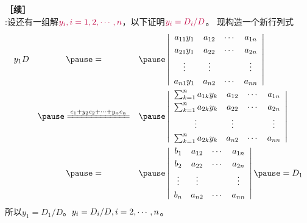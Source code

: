 \begin{frame} 
  \begin{footnotesize}
    \proofname\textbf{［续］}\\
    :设还有一组解$\textcolor{purple}{y_i, i = 1, 2, \cdots, n}$，以下证明$\textcolor{purple}{y_i =D_i/D}$。
    \pause 现构造一个新行列式
    $$
    \begin{array}{rcl}
      y_1D &\pause = &\pause \left|
      \begin{array}{cccc}
        a_{11}y_1 & a_{12}    &  \cd   &   a_{1n}      \\[0.1cm] 
        a_{21}y_1 & a_{22}    &  \cd   &   a_{2n}      \\[0.1cm] 
        \vd    &    \vd     &        &     \vd      \\[0.1cm] 
        a_{n1}y_1 & a_{n2}    &  \cd   &   a_{nn}      
      \end{array}
      \right| \\[0.4in]
      & \pause\xlongequal{c_1 + y_2 c_2 + \cd + y_n c_n} &\pause
      \left|
      \begin{array}{cccc}
        \sum_{k=1}^n a_{1k}y_k & a_{12}    &  \cd   &   a_{1n}      \\[0.1cm] 
        \sum_{k=1}^n a_{2k}y_k & a_{22}    &  \cd   &   a_{2n}      \\[0.1cm] 
        \vd    &    \vd     &        &     \vd      \\[0.1cm] 
        \sum_{k=1}^n a_{2k}y_k & a_{n2}    &  \cd   &   a_{nn}      
      \end{array}
      \right|  \\[0.4in]
      & \pause=&\pause \left|
      \begin{array}{cccc}
       b_1 & a_{12}    &  \cd   &   a_{1n}      \\[0.1cm] 
       b_2 & a_{22}    &  \cd   &   a_{2n}      \\[0.1cm] 
       \vd    &    \vd     &        &     \vd      \\[0.1cm] 
       b_n & a_{n2}    &  \cd   &   a_{nn}      
      \end{array}
      \right| \pause = D_1
    \end{array}
    $$\pause
    所以$y_1 = D_1/D$。$y_i=D_i/D, i = 2, \cdots, n$。
  \end{footnotesize}
\end{frame}


